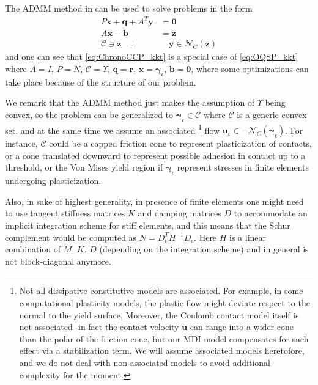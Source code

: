 \documentclass[AMA,STIX1COL]{WileyNJD-v2}
\newcommand{\vect}[1]{\bm{#1}}
\begin{document}
The ADMM method in \cite{Stellato2020} can be used to solve problems in the form
\begin{subequations}
	\begin{align}
    P \vect{x} + \vect{q} + A^T \vect{y} &= \vect{0} \\
    A \vect{x} - \vect{b} &= \vect{z} \\
    \mathcal{C} \ni \vect{z}  \quad \bot &\quad \vect{y} \in \mathcal{N}_{C}(\vect{z})
	\end{align}
	\label{eq:OQSP_kkt}
\end{subequations}
and one can see that \eqref{eq:ChronoCCP_kkt} is a special case of \eqref{eq:OQSP_kkt} where $A=I$, $P=N$, $\mathcal{C}=\Upsilon$, $\vect{q}=\vect{r}$, $\vect{x}=\vect{\gamma}_\epsilon$, $\vect{b}=\vect{0}$, where some optimizations can take place because of the structure of our problem.


We remark that the ADMM method just makes the assumption of $\Upsilon$ being convex, so the problem can be generalized to $\vect{\gamma}_\epsilon \in \mathcal{C}$ where $\mathcal{C}$ is a generic convex set, and at the same time we assume an associated 
 \footnote{Not all dissipative constitutive models are associated. For example, in some computational plasticity models, the plastic flow might deviate respect to the normal to the yield surface. Moreover, the Coulomb contact model itself is not associated -in fact the contact velocity $\vect{u}$ can range into a wider cone than the polar of the friction cone, but our MDI model compensates for such effect via a stabilization term. We will assume associated models heretofore, and we do not deal with non-associated models to avoid additional complexity for the moment.} 
flow $\vect{u}_\epsilon \in - \mathcal{N}_{C}(\vect{\gamma}_\epsilon)$. For instance, $\mathcal{C}$ could be a capped friction cone to represent plasticization of contacts, or a cone translated downward to represent possible adhesion in contact up to a threshold, or the Von Mises yield region if $\vect{\gamma}_\epsilon$ represent stresses in finite elements undergoing plasticization. 

Also, in sake of highest generality, in presence of finite elements one might need to use tangent stiffness matrices $K$ and damping matrices $D$ to accommodate an implicit integration scheme for stiff elements, and this means that the Schur complement would be computed as $N=D_{\epsilon}^T H^{-1} D_{\epsilon}$. Here $H$ is a linear combination of $M$, $K$, $D$ (depending on the integration scheme) and in general is not block-diagonal anymore. 
\end{document}
